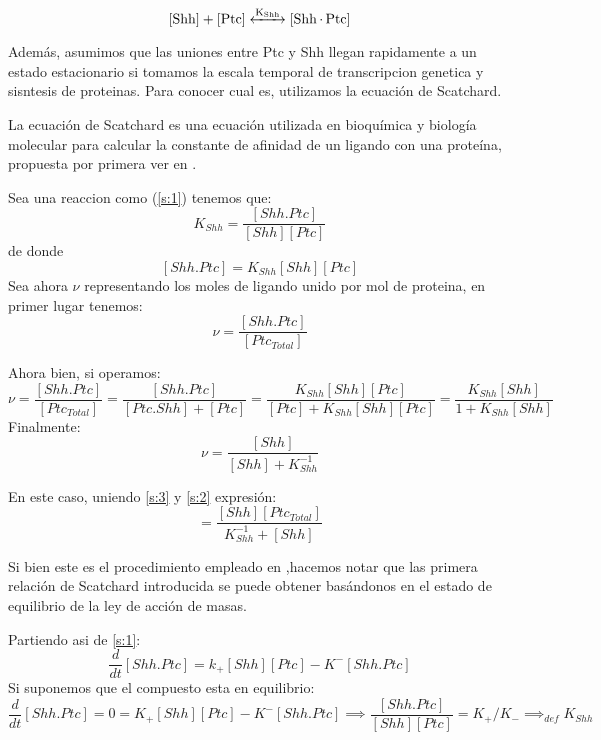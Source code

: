 \begin{equation}
\ce{[Shh] + [Ptc] <->[K_{Shh}] [Shh.Ptc] }
\label{s:1}
\end{equation}
 
 Además, asumimos que las uniones entre Ptc y Shh llegan rapidamente a un estado estacionario si tomamos la escala temporal de transcripcion genetica y sisntesis de proteinas. Para conocer cual es, utilizamos la ecuación de Scatchard.
 
 La ecuación de Scatchard es una ecuación utilizada en bioquímica y biología molecular para calcular la constante de afinidad de un ligando con una proteína, propuesta por primera ver en \cite{scatchard1949attractions}. 
 
 Sea una reaccion como (\ref{s:1}) tenemos que: 
 $$K_{Shh}=\frac{[Shh.Ptc]}{[Shh][Ptc]}$$
 de donde 
 $$[Shh.Ptc]=K_{Shh}[Shh][Ptc]$$
 Sea ahora $\nu$ representando los moles de ligando unido por mol de proteina, en primer lugar tenemos:
 \begin{equation}
 \nu=\frac{[Shh.Ptc]}{[Ptc_{Total}]}
 \label{s:2}
 \end{equation}
 
 Ahora bien, si operamos:
 $$\nu=\frac{[Shh.Ptc]}{[Ptc_{Total}]}=\frac{[Shh.Ptc]}{[Ptc.Shh]+[Ptc]}=\frac{K_{Shh}[Shh][Ptc]}{[Ptc]+K_{Shh}[Shh][Ptc]}=\frac{K_{Shh}[Shh]}{1+K_{Shh}[Shh]}$$
 Finalmente:
 \begin{equation}
 \nu=\frac{[Shh]}{[Shh]+K_{Shh}^{-1}}
 \label{s:3}
 \end{equation}
 
 En este caso, uniendo \ref{s:3} y \ref{s:2} expresión: 
 \begin{equation}
 [Shh.Ptc]=\frac{[Shh][Ptc_{Total}]}{K_{Shh}^{-1}+[Shh]}
 \label{s:6}
 \end{equation}
 
 Si bien este es el procedimiento empleado en \cite{schaffer},hacemos notar que las primera relación de Scatchard introducida se puede obtener basándonos en el estado de equilibrio de la ley de acción de masas.
 
 Partiendo asi de \ref{s:1}: 
  \begin{equation}
  \frac{d}{dt}[Shh.Ptc]=k_+[Shh][Ptc]-K^-[Shh.Ptc]
  \label{s:8}
  \end{equation}
 Si suponemos que el compuesto esta en equilibrio:
  \begin{equation}
 \frac{d}{dt}[Shh.Ptc]=0=K_+[Shh][Ptc]-K^-[Shh.Ptc] \implies \frac{[Shh.Ptc]}{[Shh][Ptc]}=K_+/K_- \implies_{def} K_{Shh}
 \label{s:9}
 \end{equation}
 
